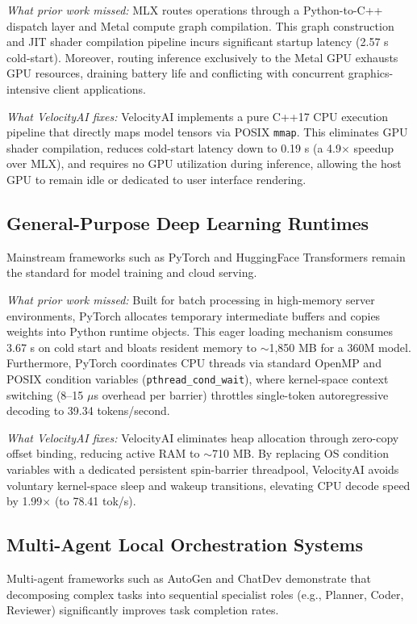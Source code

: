 \documentclass[a4paper,twocolumn,10pt]{article}
\begin{document}
\textit{What prior work missed:} MLX routes operations through a Python-to-C++ dispatch layer and Metal compute graph compilation. This graph construction and JIT shader compilation pipeline incurs significant startup latency (2.57 s cold-start). Moreover, routing inference exclusively to the Metal GPU exhausts GPU resources, draining battery life and conflicting with concurrent graphics-intensive client applications.

\textit{What VelocityAI fixes:} VelocityAI implements a pure C++17 CPU execution pipeline that directly maps model tensors via POSIX \texttt{mmap}. This eliminates GPU shader compilation, reduces cold-start latency down to 0.19 s (a 4.9$\times$ speedup over MLX), and requires no GPU utilization during inference, allowing the host GPU to remain idle or dedicated to user interface rendering.

\subsection{General-Purpose Deep Learning Runtimes}
Mainstream frameworks such as PyTorch \cite{paszke2019pytorch} and HuggingFace Transformers \cite{wolf2020transformers} remain the standard for model training and cloud serving.

\textit{What prior work missed:} Built for batch processing in high-memory server environments, PyTorch allocates temporary intermediate buffers and copies weights into Python runtime objects. This eager loading mechanism consumes 3.67 s on cold start and bloats resident memory to $\sim$1,850 MB for a 360M model. Furthermore, PyTorch coordinates CPU threads via standard OpenMP and POSIX condition variables (\texttt{pthread\_cond\_wait}), where kernel-space context switching (8--15 $\mu$s overhead per barrier) throttles single-token autoregressive decoding to 39.34 tokens/second.

\textit{What VelocityAI fixes:} VelocityAI eliminates heap allocation through zero-copy offset binding, reducing active RAM to $\sim$710 MB. By replacing OS condition variables with a dedicated persistent spin-barrier threadpool, VelocityAI avoids voluntary kernel-space sleep and wakeup transitions, elevating CPU decode speed by 1.99$\times$ (to 78.41 tok/s).

\subsection{Multi-Agent Local Orchestration Systems}
Multi-agent frameworks such as AutoGen \cite{wu2023autogen} and ChatDev \cite{qian2023chatdev} demonstrate that decomposing complex tasks into sequential specialist roles (e.g., Planner, Coder, Reviewer) significantly improves task completion rates.
\end{document}
